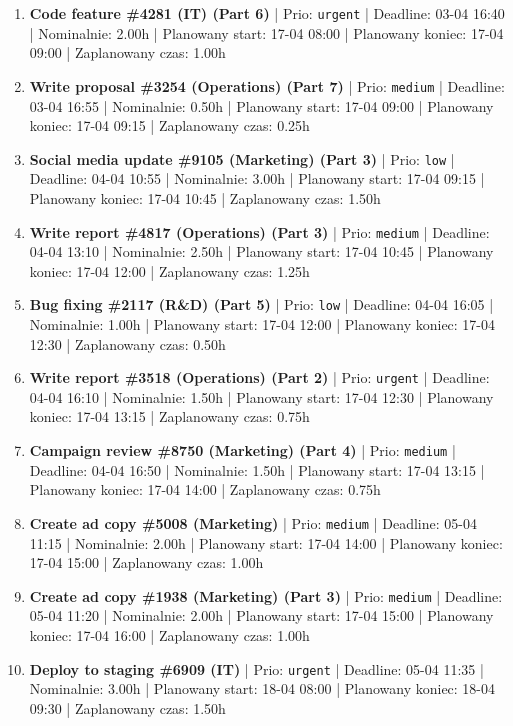 {\begin{enumerate}
  \item [\textbf{14604}] \textbf{Code feature \#4281 (IT) (Part 6)} | Prio: \texttt{urgent} | Deadline: 03-04 16:40 | Nominalnie: 2.00h | Planowany start: 17-04 08:00 | Planowany koniec: 17-04 09:00 | Zaplanowany czas: 1.00h
  \item [\textbf{14663}] \textbf{Write proposal \#3254 (Operations) (Part 7)} | Prio: \texttt{medium} | Deadline: 03-04 16:55 | Nominalnie: 0.50h | Planowany start: 17-04 09:00 | Planowany koniec: 17-04 09:15 | Zaplanowany czas: 0.25h
  \item [\textbf{14698}] \textbf{Social media update \#9105 (Marketing) (Part 3)} | Prio: \texttt{low} | Deadline: 04-04 10:55 | Nominalnie: 3.00h | Planowany start: 17-04 09:15 | Planowany koniec: 17-04 10:45 | Zaplanowany czas: 1.50h
  \item [\textbf{14639}] \textbf{Write report \#4817 (Operations) (Part 3)} | Prio: \texttt{medium} | Deadline: 04-04 13:10 | Nominalnie: 2.50h | Planowany start: 17-04 10:45 | Planowany koniec: 17-04 12:00 | Zaplanowany czas: 1.25h
  \item [\textbf{14689}] \textbf{Bug fixing \#2117 (R\&D) (Part 5)} | Prio: \texttt{low} | Deadline: 04-04 16:05 | Nominalnie: 1.00h | Planowany start: 17-04 12:00 | Planowany koniec: 17-04 12:30 | Zaplanowany czas: 0.50h
  \item [\textbf{14598}] \textbf{Write report \#3518 (Operations) (Part 2)} | Prio: \texttt{urgent} | Deadline: 04-04 16:10 | Nominalnie: 1.50h | Planowany start: 17-04 12:30 | Planowany koniec: 17-04 13:15 | Zaplanowany czas: 0.75h
  \item [\textbf{14632}] \textbf{Campaign review \#8750 (Marketing) (Part 4)} | Prio: \texttt{medium} | Deadline: 04-04 16:50 | Nominalnie: 1.50h | Planowany start: 17-04 13:15 | Planowany koniec: 17-04 14:00 | Zaplanowany czas: 0.75h
  \item [\textbf{14666}] \textbf{Create ad copy \#5008 (Marketing)} | Prio: \texttt{medium} | Deadline: 05-04 11:15 | Nominalnie: 2.00h | Planowany start: 17-04 14:00 | Planowany koniec: 17-04 15:00 | Zaplanowany czas: 1.00h
  \item [\textbf{14652}] \textbf{Create ad copy \#1938 (Marketing) (Part 3)} | Prio: \texttt{medium} | Deadline: 05-04 11:20 | Nominalnie: 2.00h | Planowany start: 17-04 15:00 | Planowany koniec: 17-04 16:00 | Zaplanowany czas: 1.00h
  \item [\textbf{14597}] \textbf{Deploy to staging \#6909 (IT)} | Prio: \texttt{urgent} | Deadline: 05-04 11:35 | Nominalnie: 3.00h | Planowany start: 18-04 08:00 | Planowany koniec: 18-04 09:30 | Zaplanowany czas: 1.50h

\end{enumerate}}
